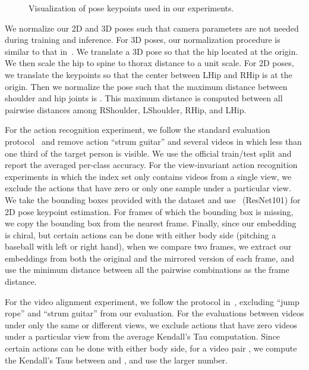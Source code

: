 \begin{figure}[t]
  \centering
  


\caption{Visualization of pose keypoints used in our experiments.}
\label{fig:skeleton}
\end{figure}

 We normalize our 2D and 3D poses such that camera parameters are not needed during training and inference. 
For 3D poses, our normalization procedure is similar to that in~\cite{chen2019unsupervised}. We translate a 3D pose so that the hip located at the origin. We then scale the hip to spine to thorax distance to a unit scale. 
For 2D poses, we translate the keypoints so that the center between LHip and RHip is at the origin. Then we normalize the pose such that the maximum distance between shoulder and hip joints is . This maximum distance is computed between all pairwise distances among RShoulder, LShoulder, RHip, and LHip.

 For the action recognition experiment, we follow the standard evaluation protocol~\cite{xia2012view} and remove action ``strum guitar'' and several videos in which less than one third of the target person is visible. We use the official train/test split and report the averaged per-class accuracy. For the view-invariant action recognition experiments in which the index set only contains videos from a single view, we exclude the actions that have zero or only one sample under a particular view. We take the bounding boxes provided with the dataset and use~\cite{papandreou2017towards} (ResNet101) for 2D pose keypoint estimation. For frames of which the bounding box is missing, we copy the bounding box from the nearest frame. Finally, since our embedding is chiral, but certain actions can be done with either body side (pitching a baseball with left or right hand), when we compare two frames, we extract our embeddings from both the original and the mirrored version of each frame, and use the minimum distance between all the pairwise combinations as the frame distance.

For the video alignment experiment, we follow the protocol in~\cite{dwibedi2019temporal}, excluding ``jump rope'' and ``strum guitar'' from our evaluation. For the evaluations between videos under only the same or different views, we exclude actions that have zero videos under a particular view from the average Kendall's Tau computation. Since certain actions can be done with either body side, for a video pair , we compute the Kendall's Taus between  and , and use the larger number.

